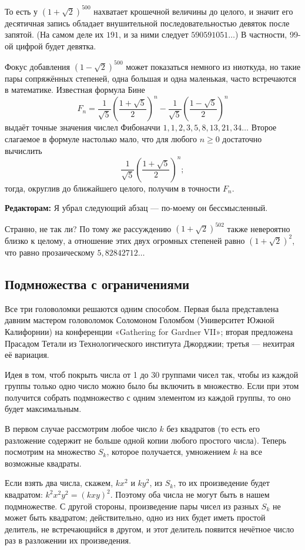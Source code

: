То есть у $(1+\sqrt{2})^{500}$ нахватает крошечной величины до целого, и значит его десятичная запись обладает внушительной последовательностью девяток после запятой.
(На самом деле их $191$, и за ними следует $590591051\dots$)
В частности, 99-ой цифрой будет девятка.

Фокус добавления $(1-\sqrt{2})^{500}$ может показаться немного из ниоткуда, но такие пары сопряжённых степеней, одна большая и одна маленькая, часто встречаются в математике.
Известная формула Бине
\[F_n=\frac{1}{\sqrt{5}}\left(\frac{1+\sqrt{5}}2\right)^n-\frac{1}{\sqrt{5}}\left(\frac{1-\sqrt{5}}2\right)^n\]
выдаёт точные значения числел Фибоначчи $1, 1, 2, 3, 5, 8, 13, 21, 34 \dots$
Второе слагаемое в формуле настолько мало, что для любого $n \ge 0$ достаточно вычислить
\[\frac{1}{\sqrt{5}}\left(\frac{1+\sqrt{5}}2\right)^n;\]
тогда, округлив до ближайшего целого, получим в точности $F_n$.

\begin{addedbytheeditors}
\textbf{Редакторам:}
Я убрал следующий абзац --- по-моему он бессмысленный.

Странно, не так ли?
По тому же рассуждению $(1+\sqrt{2})^{502}$ также невероятно близко к целому,
а отношение этих двух огромных степеней равно $(1+\sqrt{2})^{2}$, что равно прозаическому  $5{,}82842712\dots$
\end{addedbytheeditors}

\subsection*{Подмножества с ограничениями}

Все три головоломки решаются одним способом.
Первая была представлена давним мастером головоломок Соломоном Голомбом (Университет Южной Калифорнии) на конференции
«Ga\-the\-ring for Gard\-ner VII»;
вторая предложена Прасадом Тетали из Технологического института Джорджии;
третья --- нехитрая её вариация.

Идея в том, чтоб покрыть числа от 1 до 30 группами чисел так, чтобы из каждой группы только одно число можно было бы включить в множество.
Если при этом получится собрать подмножество с одним элементом из каждой группы, то оно будет максимальным.

В первом случае рассмотрим любое число $k$ без квадратов (то есть его разложение содержит не больше одной копии любого простого числа).
Теперь посмотрим на множество $S_k$, которое получается, умножением $k$ на все возможные квадраты.

Если взять два числа, скажем, $kx^2$ и $ky^2$, из $S_k$, то их произведение будет квадратом: $k^2x^2y^2 = (kxy)^2$.
Поэтому оба числа не могут быть в нашем подмножестве.
С другой стороны, произведение пары чисел из разных $S_k$ не может быть квадратом;
действительно, одно из них будет иметь простой делитель, не встречающийся в другом, и этот делитель появится нечётное число раз в разложении их произведения.

